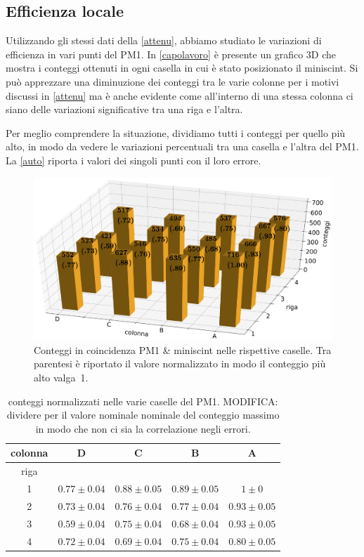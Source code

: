 \subsection{Efficienza locale}
\label{localis}
Utilizzando gli stessi dati della \autoref{attenu}, abbiamo studiato le variazioni di efficienza in vari punti del PM1. In \autoref{capolavoro} è presente un grafico 3D che mostra i conteggi ottenuti in ogni casella in cui è stato posizionato il miniscint. Si può apprezzare una diminuzione dei conteggi tra le varie colonne per i motivi discussi in \autoref{attenu} ma è anche evidente come all'interno di una stessa colonna ci siano delle variazioni significative tra una riga e l'altra.

Per meglio comprendere la situazione, dividiamo tutti i conteggi per quello più alto,
in modo da vedere le variazioni percentuali tra una casella e l'altra del PM1.
La \autoref{auto} riporta i valori dei singoli punti con il loro errore.

\begin{figure}[h]
	\includegraphics[width=\textwidth]{3d_grande}
	\caption{Conteggi in coincidenza PM1 \& miniscint nelle rispettive caselle.
	Tra parentesi è riportato il valore normalizzato in modo il conteggio più alto valga~1.}
	\label{capolavoro}
\end{figure}

\begin{table}[h]
\centering
\begin{tabular}{|c|c|c|c|c|}
\hline
colonna & D & C & B & A \\
 \hline
riga  & & & &  \\
1 &  $ 0.77 \pm 0.04 $ & $ 0.88 \pm 0.05 $ & $ 0.89 \pm 0.05 $ & $ 1 \pm 0 $ \\ 
2 &  $ 0.73 \pm 0.04 $ & $ 0.76 \pm 0.04 $ & $ 0.77 \pm 0.04 $ & $ 0.93 \pm 0.05 $ \\ 
3 &  $ 0.59 \pm 0.04 $ & $ 0.75 \pm 0.04 $ & $ 0.68 \pm 0.04 $ & $ 0.93 \pm 0.05 $ \\ 
4 &  $ 0.72 \pm 0.04 $ & $ 0.69 \pm 0.04 $ & $ 0.75 \pm 0.04 $ & $ 0.80 \pm 0.05 $ \\
\hline 
\end{tabular}
\caption{conteggi normalizzati nelle varie caselle del PM1.
MODIFICA: dividere per il valore nominale nominale del conteggio massimo in modo che non ci sia la correlazione negli errori.}
\label{auto}
\end{table}
